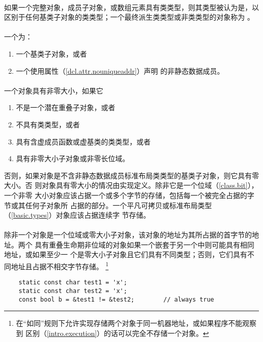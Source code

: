 \paragraph{} %
如果一个完整对象，成员子对象，或数组元素具有类类型，则其类型被认为是，以区别于任何基类子对象的类类型；一个最终派生类类型或非类类型的对象称为
。

\paragraph{} %
一个为：
\begin{enumerate}
  \item 一个基类子对象，或者
  \item 一个使用属性（\ref{dcl.attr.nouniqueaddr}）声明
        的非静态数据成员。
\end{enumerate}

\paragraph{} %
一个对象具有非零大小，如果它
\begin{enumerate}
  \item 不是一个潜在重叠子对象，或者
  \item 不具有类类型，或者
  \item 具有含虚成员函数或虚基类的类类型，或者
  \item 具有非零大小子对象或非零长位域。
\end{enumerate}
否则，如果对象是不含非静态数据成员标准布局类类型的基类子对象，则它具有零大小。否
则对象具有零大小的情况由实现定义。除非它是一个位域（\ref{class.bit}），一个非零
大小对象应该占据一个或多个字节的存储，包括每一个被完全占据的字节或其任何子对象所
占据的部分。一个平凡可拷贝或标准布局类型（\ref{basic.types}）对象应该占据连续字
节存储。

\paragraph{} %
除非一个对象是一个位域或零大小子对象，该对象的地址为其所占据的首字节的地址。两个
具有重叠生命期非位域的对象如果一个嵌套于另一个中则可能具有相同地址，或如果至少一
个是零大小子对象且它们具有不同类型；否则，它们具有不同地址且占据不相交字节存储。
\footnote{在“如同”规则下允许实现存储两个对象于同一机器地址，或如果程序不能观察到
区别（\ref{intro.execution}）的话可以完全不存储一个对象。}

\begin{example}
  \begin{lstlisting}
    static const char test1 = 'x';
    static const char test2 = 'x';
    const bool b = &test1 != &test2;        // always true
  \end{lstlisting}
\end{example}

